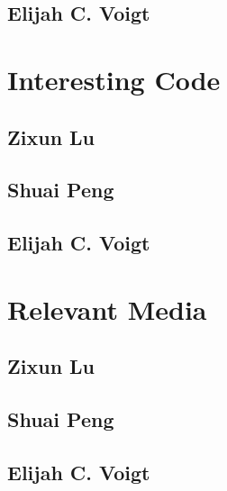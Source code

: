 \subsection{Elijah C. Voigt}

\section{Interesting Code}

\subsection{Zixun Lu}

\subsection{Shuai Peng}

\subsection{Elijah C. Voigt}


\section{Relevant Media}

\subsection{Zixun Lu}

\subsection{Shuai Peng}

\subsection{Elijah C. Voigt}

\printbibliography


                                                                                                                                                                                                                                                                                                                                                                                                                                                                                                                                                                                                                                                                                                                                             